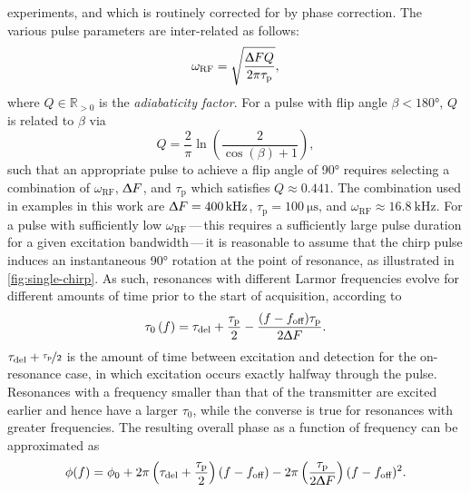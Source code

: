 experiments, and which is routinely corrected for by phase correction.
The various pulse parameters are inter-related as
follows\cite{Foroozandeh2019,Kupce1995b}:
\begin{equation}
    \omega_{\text{RF}} = \sqrt{
        \frac{\Updelta F Q}{2 \pi \tau_{\text{p}}}
    },
\end{equation}
where $Q \in \mathbb{R}_{>0}$ is the \emph{adiabaticity factor}.
For a pulse with flip angle  $\beta < \ang{180}$, $Q$ is related to $\beta$ via
\begin{equation}
    Q = \frac{2}{\pi} \ln \left( \frac{2}{\cos(\beta) + 1} \right),
\end{equation}
such that an appropriate pulse to achieve a flip angle of \ang{90} requires
selecting a combination of $\omega_{\text{RF}}$, $\Updelta F$, and
$\tau_{\text{p}}$ which satisfies $Q \approx 0.441$.
The combination used in examples in this work are $\Updelta F =
\qty{400}{\kilo\hertz}$, $\tau_{\text{p}} = \qty{100}{\micro\second}$, and
$\omega_{\text{RF}} \approx \qty{16.8}{\kilo\hertz}$.
For a pulse with sufficiently low $\omega_{\text{RF}}$\,---\,this requires a
sufficiently large pulse duration for a given excitation bandwidth\,---\,it is
reasonable to assume that the chirp pulse induces an instantaneous \ang{90}
rotation at the point of resonance, as illustrated in
\cref{fig:single-chirp}. As such, resonances with different
Larmor frequencies evolve for different amounts of time prior to the start of
acquisition, according to
\begin{equation}
    \tau_0\left(f\right) =
        \tau_{\text{del}} + \frac{\tau_{\text{p}}}{2} -
        \frac{(f - f_{\text{off}}) \tau_{\text{p}}}{2 \Updelta F}.
    \label{eq:t0}
\end{equation}
$\tau_{\text{del}} + \nicefrac{\tau_{\text{p}}}{2}$ is the amount of time
between excitation and detection for the on-resonance case, in which
excitation occurs exactly halfway through the pulse. Resonances
with a frequency smaller than that of the transmitter are excited earlier and hence
have a larger $\tau_0$, while the converse is true for resonances with greater
frequencies. The resulting overall phase as a function of frequency can be
approximated as\cite{Foroozandeh2019}
\begin{equation}
    \phi(f) = \phi_0 + 2 \pi \left(\tau_{\text{del}} + \frac{\tau_{\text{p}}}{2} \right) (f - f_{\text{off}}) -
        2 \pi \left(\frac{\tau_{\text{p}}}{2 \Updelta F}\right)
        (f - f_{\text{off}})^2.
    \label{eq:quadratic-phase}
\end{equation}
